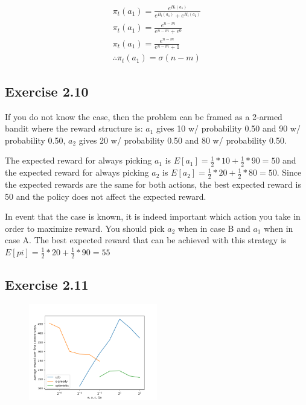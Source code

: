 \begin{gather}
  \pi_t(a_1) = \frac{e^{H_t(a_1)}}{e^{H_t(a_1)} + e^{H_t(a_2)}} \\
  \pi_t(a_1) = \frac{e^{n-m}}{e^{n-m} + e^{0}} \\
  \pi_t(a_1) = \frac{e^{n-m}}{e^{n-m} + 1} \\
  \therefore
  \pi_t(a_1) = \sigma(n-m)
\end{gather}

\subsection{Exercise 2.10}
If you do not know the case, then the problem can be framed as a 2-armed bandit where the reward structure is: $a_1$ gives 10 w/ probability 0.50 and 90 w/ probability 0.50, $a_2$ gives 20 w/ probability 0.50 and 80 w/ probability 0.50. 

The expected reward for always picking $a_1$ is $E[a_1] = \frac{1}{2} * 10 + \frac{1}{2} * 90 = 50$ and the expected reward for always picking $a_2$ is $E[a_2] = \frac{1}{2} * 20 + \frac{1}{2} * 80 = 50$. Since the expected rewards are the same for both actions, the best expected reward is 50 and the policy does not affect the expected reward.

In event that the case is known, it is indeed important which action you take in order to maximize reward. You should pick $a_2$ when in case B and $a_1$ when in case A. The best expected reward that can be achieved with this strategy is $E[pi] = \frac{1}{2} * 20 + \frac{1}{2} * 90 = 55$

\subsection{Exercise 2.11}
\begin{figure}[htbp]
  \centering
  \includegraphics[width=0.5\textwidth]{../../code/figures/chapter2/exercise2.11.png}
\end{figure}